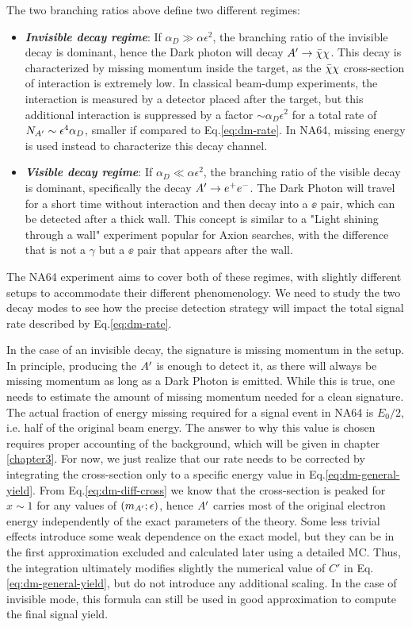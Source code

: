 The two branching ratios above define two different regimes:
\begin{itemize}
\item \textbf{\textit{Invisible decay regime}}: If $\alpha_D \gg \alpha \epsilon^2$, the branching ratio of the invisible decay is dominant, hence the Dark photon will decay $A' \to \bar{\chi} \chi$. This decay is characterized by missing momentum inside the target, as the $\bar{\chi} \chi$ cross-section of interaction is extremely low. In classical beam-dump experiments, the interaction is measured by a detector placed after the target, but this additional interaction is suppressed by a factor $\sim \alpha_D \epsilon^2$ for a total rate of $N_{A'} \sim \epsilon^4 \alpha_D$, smaller if compared to Eq.\ref{eq:dm-rate}. In NA64, missing energy is used instead to characterize this decay channel.
\item \textbf{\textit{Visible decay regime}}: If $\alpha_D \ll \alpha \epsilon^2$, the branching ratio of the visible decay is dominant, specifically the decay $A' \to e^+e^-$. The Dark Photon will travel for a short time without interaction and then decay into a $\ee$ pair, which can be detected after a thick wall. This concept is similar to a "Light shining through a wall" experiment popular for Axion searches, with the difference that is not a $\gamma$ but a $\ee$ pair that appears after the wall.
\end{itemize}

The NA64 experiment aims to cover both of these regimes, with slightly different setups to accommodate their different phenomenology. We need to study the two decay modes to see how the precise detection strategy will impact the total signal rate described by Eq.\ref{eq:dm-rate}.

In the case of an invisible decay, the signature is missing momentum in the setup. In principle, producing the $A'$ is enough to detect it, as there will always be missing momentum as long as a Dark Photon is emitted. While this is true, one needs to estimate the amount of missing momentum needed for a clean signature. The actual fraction of energy missing required for a signal event in NA64 is $E_0/2$, i.e. half of the original beam energy. The answer to why this value is chosen requires proper accounting of the background, which will be given in chapter \ref{chapter3}.  For now, we just realize that our rate needs to be corrected by integrating the cross-section only to a specific energy value in Eq.\ref{eq:dm-general-yield}. From Eq.\ref{eq:dm-diff-cross} we know that the cross-section is peaked for $x \sim 1$ for any values of $(m_{A'};\epsilon)$, hence $A'$ carries most of the original electron energy independently of the exact parameters of the theory. Some less trivial effects introduce some weak dependence on the exact model, but they can be in the first approximation excluded and calculated later using a detailed MC. Thus, the integration ultimately modifies slightly the numerical value of $C'$ in Eq.\ref{eq:dm-general-yield}, but do not introduce any additional scaling. In the case of invisible mode, this formula can still be used in good approximation to compute the final signal yield.

